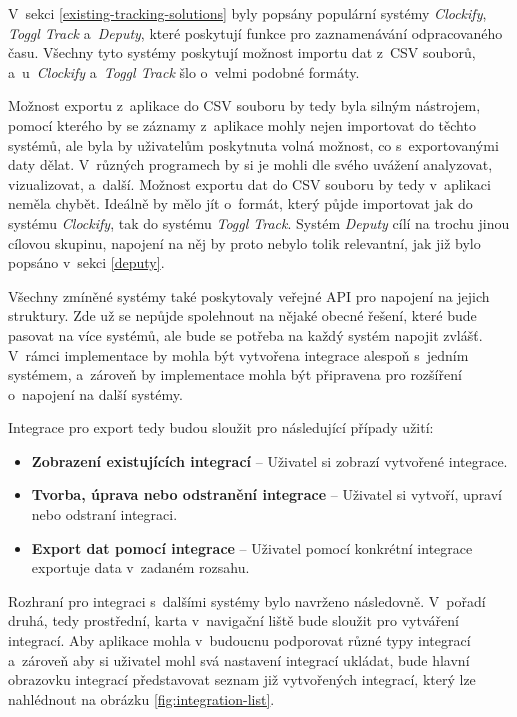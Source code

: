 V~sekci \ref{existing-tracking-solutions} byly popsány populární systémy \emph{Clockify}, \emph{Toggl Track} a~\emph{Deputy}, které poskytují funkce pro zaznamenávání odpracovaného času. Všechny tyto systémy poskytují možnost importu dat z~CSV souborů, a~u~\emph{Clockify} a~\emph{Toggl Track} šlo o~velmi podobné formáty.

Možnost exportu z~aplikace do CSV souboru by tedy byla silným nástrojem, pomocí kterého by se záznamy z~aplikace mohly nejen importovat do těchto systémů, ale byla by uživatelům poskytnuta volná možnost, co s~exportovanými daty dělat. V~různých programech by si je mohli dle svého uvážení analyzovat, vizualizovat, a~další. Možnost exportu dat do CSV souboru by tedy v~aplikaci neměla chybět. Ideálně by mělo jít o~formát, který půjde importovat jak do systému \emph{Clockify}, tak do systému \emph{Toggl Track}. Systém \emph{Deputy} cílí na trochu jinou cílovou skupinu, napojení na něj by proto nebylo tolik relevantní, jak již bylo popsáno v~sekci \ref{deputy}.

Všechny zmíněné systémy také poskytovaly veřejné API pro napojení na jejich struktury. Zde už se nepůjde spolehnout na nějaké obecné řešení, které bude pasovat na více systémů, ale bude se potřeba na každý systém napojit zvlášť. V~rámci implementace by mohla být vytvořena integrace alespoň s~jedním systémem, a~zároveň by implementace mohla být připravena pro rozšíření o~napojení na další systémy.

Integrace pro export tedy budou sloužit pro následující případy užití:
\begin{itemize}
\item\textbf{Zobrazení existujících integrací} – Uživatel si zobrazí vytvořené integrace.
\item\textbf{Tvorba, úprava nebo odstranění integrace} – Uživatel si vytvoří, upraví nebo odstraní integraci.
\item\textbf{Export dat pomocí integrace} – Uživatel pomocí konkrétní integrace exportuje data v~zadaném rozsahu.
\end{itemize}

Rozhraní pro integraci s~dalšími systémy bylo navrženo následovně. V~pořadí druhá, tedy prostřední, karta v~navigační liště bude sloužit pro vytváření integrací. Aby aplikace mohla v~budoucnu podporovat různé typy integrací a~zároveň aby si uživatel mohl svá nastavení integrací ukládat, bude hlavní obrazovku integrací představovat seznam již vytvořených integrací, který lze nahlédnout na obrázku \ref{fig:integration-list}.

